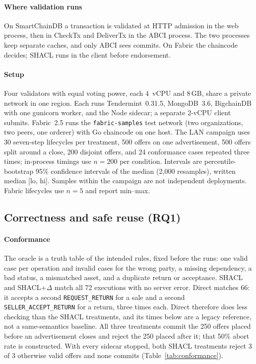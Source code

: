 \documentclass[sigconf,anonymous,review]{acmart}
\begin{document}
\paragraph{Where validation runs}
On SmartChainDB a transaction is validated at HTTP admission in the web
process, then in CheckTx and DeliverTx in the ABCI process. The two processes
keep separate caches, and only ABCI sees commits. On Fabric the chaincode
decides; SHACL runs in the client before endorsement.

\paragraph{Setup}
Four validators with equal voting power, each 4~vCPU and 8\,GB, share a
private network in one region. Each runs Tendermint~0.31.5, MongoDB~3.6,
BigchainDB with one gunicorn worker, and the Node sidecar; a separate
2-vCPU client submits. Fabric~2.5 runs the \texttt{fabric-samples} test
network (two organizations, two peers, one orderer) with Go chaincode on one
host. The LAN campaign uses 30 seven-step lifecycles per treatment, 500
offers on one advertisement, 500 offers split around a close, 200 disjoint
offers, and 24 conformance cases repeated three times; in-process timings use
$n{=}200$ per condition. Intervals are percentile-bootstrap 95\% confidence
intervals of the median (2{,}000 resamples), written median [lo, hi]. Samples
within the campaign are not independent deployments. Fabric lifecycles use
$n{=}5$ and report min--max.

\subsection{Correctness and safe reuse (RQ1)}
\label{sec:safety}

\paragraph{Conformance}
The oracle is a truth table of the intended rules, fixed before the runs: one
valid case per operation and invalid cases for the wrong party, a missing
dependency, a bad status, a mismatched asset, and a duplicate return or
acceptance. SHACL and SHACL+$\Delta$ match all 72 executions with no server
error. Direct matches 66: it accepts a second \texttt{REQUEST\_RETURN} for a
sale and a second \texttt{SELLER\_ACCEPT\_RETURN} for a return, three times
each. Direct therefore does less checking than the SHACL treatments, and its
times below are a legacy reference, not a same-semantics baseline. All three
treatments commit the 250 offers placed before an advertisement closes and
reject the 250 placed after it; that 50\% abort rate is constructed. With
every sidecar stopped, both SHACL treatments reject 3 of 3 otherwise valid
offers and none commits (Table~\ref{tab:conformance}).
\end{document}
